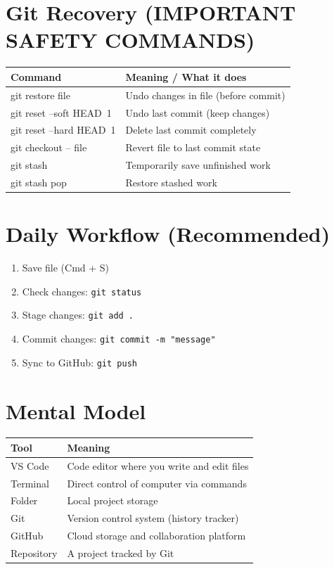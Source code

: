 \documentclass[11pt]{article}
\begin{document}
\vspace{0.6cm}

\section*{Git Recovery (IMPORTANT SAFETY COMMANDS)}

\begin{tabular}{|p{6cm}|p{8.5cm}|}
\hline
\textbf{Command} & \textbf{Meaning / What it does} \\
\hline
git restore file & Undo changes in file (before commit) \\
git reset --soft HEAD~1 & Undo last commit (keep changes) \\
git reset --hard HEAD~1 & Delete last commit completely \\
git checkout -- file & Revert file to last commit state \\
git stash & Temporarily save unfinished work \\
git stash pop & Restore stashed work \\
\hline
\end{tabular}

\vspace{0.6cm}
\newpage
\section*{Daily Workflow (Recommended)}

\begin{enumerate}
\item Save file (Cmd + S)
\item Check changes: \texttt{git status}
\item Stage changes: \texttt{git add .}
\item Commit changes: \texttt{git commit -m "message"}
\item Sync to GitHub: \texttt{git push}
\end{enumerate}

\vspace{0.6cm}

\section*{Mental Model}

\begin{tabular}{|p{4cm}|p{10cm}|}
\hline
\textbf{Tool} & \textbf{Meaning} \\
\hline
VS Code & Code editor where you write and edit files \\
Terminal & Direct control of computer via commands \\
Folder & Local project storage \\
Git & Version control system (history tracker) \\
GitHub & Cloud storage and collaboration platform \\
Repository & A project tracked by Git \\
\hline
\end{tabular}
\end{document}
